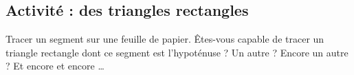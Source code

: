 
\subsection*{Activité : des triangles rectangles}

Tracer un segment sur une feuille de papier.  Êtes-vous capable de tracer un triangle rectangle dont ce segment est l'hypoténuse ? Un autre ? Encore un autre ? Et encore et encore \ldots
